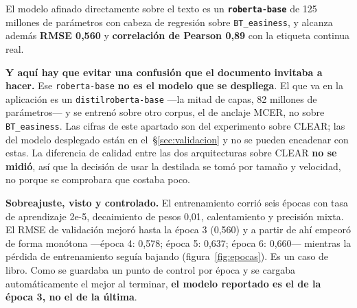 \documentclass[11pt,a4paper]{article}
\newcommand{\cod}[1]{\texttt{\small #1}}
\begin{document}
El modelo afinado directamente sobre el texto es un \textbf{\cod{roberta-base}} de 125
millones de parámetros con cabeza de regresión sobre \cod{BT\_easiness}, y alcanza además
\textbf{RMSE 0,560} y \textbf{correlación de Pearson 0,89} con la etiqueta continua real.

\textbf{Y aquí hay que evitar una confusión que el documento invitaba a hacer.} Ese
\cod{roberta-base} \textbf{no es el modelo que se despliega}. El que va en la aplicación es
un \cod{distil\allowbreak roberta-base} —la mitad de capas, 82 millones de parámetros— y se entrenó
sobre otro corpus, el de anclaje MCER, no sobre \cod{BT\_easiness}. Las cifras de este
apartado son del experimento sobre CLEAR; las del modelo desplegado están en
el~\S\ref{sec:validacion} y no se pueden encadenar con estas. La diferencia de calidad
entre las dos arquitecturas sobre CLEAR \textbf{no se midió}, así que la decisión de usar
la destilada se tomó por tamaño y velocidad, no porque se comprobara que costaba poco.

\textbf{Sobreajuste, visto y controlado.} El entrenamiento corrió seis épocas con tasa de
aprendizaje 2e-5, decaimiento de pesos 0,01, calentamiento y precisión mixta. El RMSE de
validación mejoró hasta la época 3 (0,560) y a partir de ahí empeoró de forma monótona
—época 4: 0,578; época 5: 0,637; época 6: 0,660— mientras la pérdida de entrenamiento
seguía bajando (figura~\ref{fig:epocas}). Es un caso de libro. Como se guardaba un punto
de control por época y se cargaba automáticamente el mejor al terminar, \textbf{el modelo
reportado es el de la época 3, no el de la última}.
\end{document}
